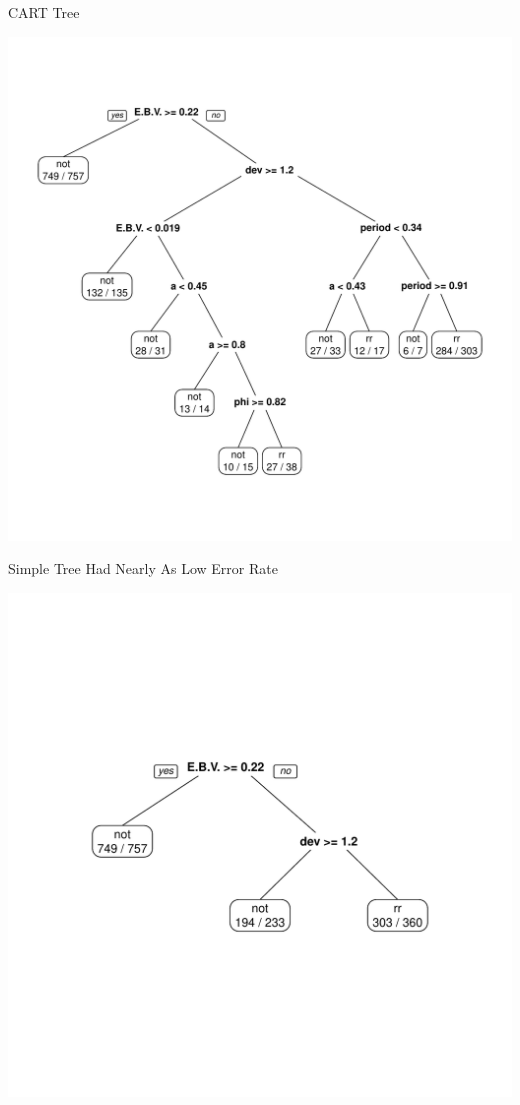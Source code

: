 \documentclass[12pt]{beamer}
\begin{document}
\begin{frame}{CART Tree}
  \begin{center}
    \includegraphics[scale=0.4]{figs/rpart_fulltree.pdf}
    \end{center}
\end{frame}

\begin{frame}{Simple Tree Had Nearly As Low Error Rate}

  \vspace{-.5in}

  \begin{center}
    \includegraphics[scale=0.6]{figs/rpart_pruned.pdf}
    \end{center}
\end{frame}
\end{document}
